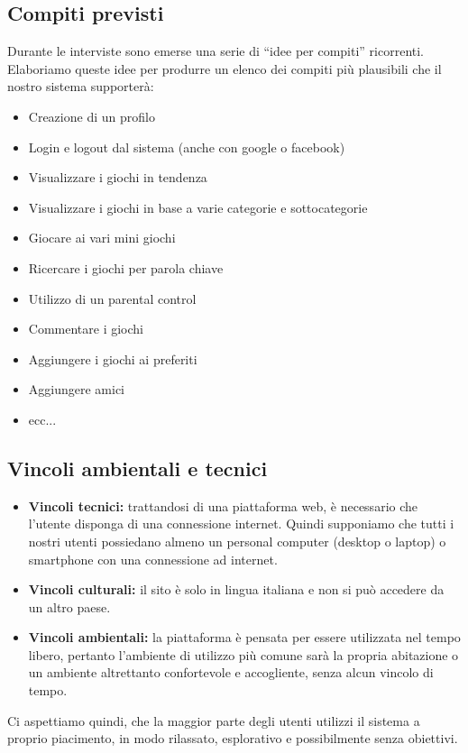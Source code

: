 \documentclass[../Report.tex]{subfiles}
\begin{document}
        \subsection{Compiti previsti}
        Durante le interviste sono emerse una serie di “idee per compiti” ricorrenti. Elaboriamo queste idee per produrre un elenco dei compiti più plausibili che il nostro sistema supporterà:
        \begin{itemize}
            \item Creazione di un profilo
            \item Login e logout dal sistema (anche con google o facebook)
            \item Visualizzare i giochi in tendenza
            \item Visualizzare i giochi in base a varie categorie e sottocategorie
            \item Giocare ai vari mini giochi
            \item Ricercare i giochi per parola chiave
            \item Utilizzo di un parental control
            \item Commentare i giochi
            \item Aggiungere i giochi ai preferiti
            \item Aggiungere amici
            \item ecc...
        \end{itemize}

        \subsection{Vincoli ambientali e tecnici}
        \begin{itemize}
            \item \textbf{Vincoli tecnici:} trattandosi di una piattaforma web, è necessario che l'utente disponga di una connessione internet. Quindi supponiamo che tutti i nostri utenti possiedano almeno un personal computer (desktop o laptop) o smartphone con una connessione ad internet.
            \item \textbf{Vincoli culturali:} il sito è solo in lingua italiana e non si può accedere da un altro paese.
            \item \textbf{Vincoli ambientali:} la piattaforma è pensata per essere utilizzata nel tempo libero, pertanto l'ambiente di utilizzo più comune sarà la propria abitazione o un ambiente altrettanto confortevole e accogliente, senza alcun vincolo di tempo.
        \end{itemize}
        Ci aspettiamo quindi, che la maggior parte degli utenti utilizzi il sistema a proprio piacimento, in modo rilassato, esplorativo e possibilmente senza obiettivi.
\end{document}
